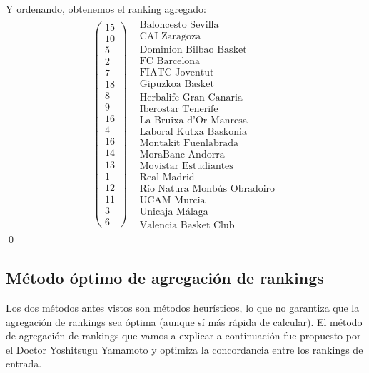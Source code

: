 Y ordenando, obtenemos el ranking agregado:\\
\[
\begin{array}{cc}
\left(\begin{array}{c}
15\\
10\\
5\\
2\\
7\\
18\\
8\\
9\\
16\\
4\\
16\\
14\\
13\\
1\\
12\\
11\\
3\\
6
\end{array} \right) & \begin{array}{c}
\text{Baloncesto Sevilla}\\
\text{CAI Zaragoza} \\
\text{Dominion Bilbao Basket} \\
\text{FC Barcelona} \\
\text{FIATC Joventut} \\
\text{Gipuzkoa Basket} \\
\text{Herbalife Gran Canaria} \\
\text{Iberostar Tenerife} \\
\text{La Bruixa d'Or Manresa} \\
\text{Laboral Kutxa Baskonia} \\
\text{Montakit Fuenlabrada} \\
\text{MoraBanc Andorra} \\
\text{Movistar Estudiantes} \\
\text{Real Madrid} \\
\text{Río Natura Monbús Obradoiro} \\
\text{UCAM Murcia} \\
\text{Unicaja Málaga} \\
\text{Valencia Basket Club}
\end{array} 
\end{array} 
\]
\qed


\subsection{Método óptimo de agregación de rankings}
Los dos métodos antes vistos son métodos heurísticos, lo que no garantiza que la agregación de rankings sea óptima (aunque sí más rápida de calcular). El método de agregación de rankings que vamos a explicar a continuación fue propuesto por el Doctor Yoshitsugu Yamamoto y optimiza la concordancia entre los rankings de entrada.\\

